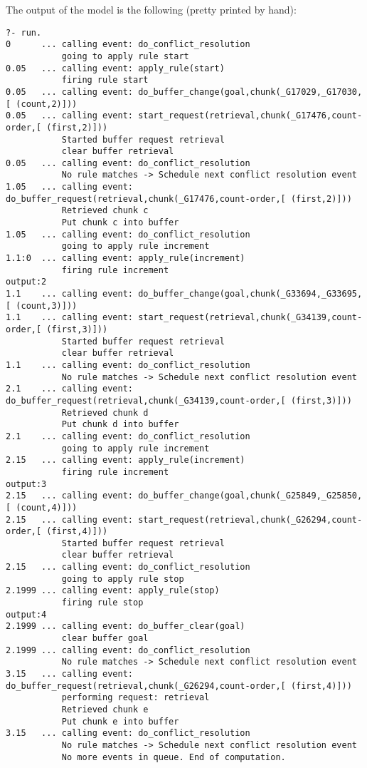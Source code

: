 The output of the model is the following (pretty printed by hand):

\raggedbottom
\begin{lstlisting}
?- run.
0      ... calling event: do_conflict_resolution
           going to apply rule start
0.05   ... calling event: apply_rule(start)
           firing rule start
0.05   ... calling event: do_buffer_change(goal,chunk(_G17029,_G17030,[ (count,2)]))
0.05   ... calling event: start_request(retrieval,chunk(_G17476,count-order,[ (first,2)]))
           Started buffer request retrieval
           clear buffer retrieval
0.05   ... calling event: do_conflict_resolution
           No rule matches -> Schedule next conflict resolution event
1.05   ... calling event: do_buffer_request(retrieval,chunk(_G17476,count-order,[ (first,2)]))
           Retrieved chunk c
           Put chunk c into buffer
1.05   ... calling event: do_conflict_resolution
           going to apply rule increment
1.1:0  ... calling event: apply_rule(increment)
           firing rule increment
output:2
1.1    ... calling event: do_buffer_change(goal,chunk(_G33694,_G33695,[ (count,3)]))
1.1    ... calling event: start_request(retrieval,chunk(_G34139,count-order,[ (first,3)]))
           Started buffer request retrieval
           clear buffer retrieval
1.1    ... calling event: do_conflict_resolution
           No rule matches -> Schedule next conflict resolution event
2.1    ... calling event: do_buffer_request(retrieval,chunk(_G34139,count-order,[ (first,3)]))
           Retrieved chunk d
           Put chunk d into buffer
2.1    ... calling event: do_conflict_resolution
           going to apply rule increment
2.15   ... calling event: apply_rule(increment)
           firing rule increment
output:3
2.15   ... calling event: do_buffer_change(goal,chunk(_G25849,_G25850,[ (count,4)]))
2.15   ... calling event: start_request(retrieval,chunk(_G26294,count-order,[ (first,4)]))
           Started buffer request retrieval
           clear buffer retrieval
2.15   ... calling event: do_conflict_resolution
           going to apply rule stop
2.1999 ... calling event: apply_rule(stop)
           firing rule stop
output:4
2.1999 ... calling event: do_buffer_clear(goal)
           clear buffer goal
2.1999 ... calling event: do_conflict_resolution
           No rule matches -> Schedule next conflict resolution event
3.15   ... calling event: do_buffer_request(retrieval,chunk(_G26294,count-order,[ (first,4)]))
           performing request: retrieval
           Retrieved chunk e
           Put chunk e into buffer
3.15   ... calling event: do_conflict_resolution
           No rule matches -> Schedule next conflict resolution event
           No more events in queue. End of computation.
\end{lstlisting}
\flushbottom

